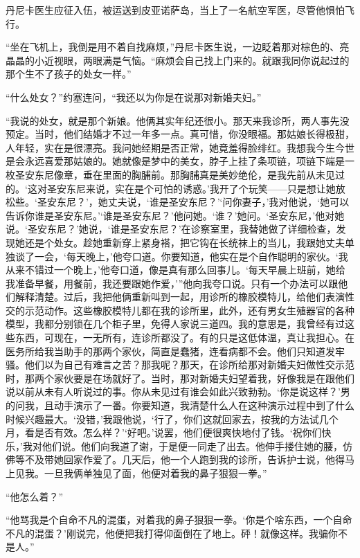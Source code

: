     丹尼卡医生应征入伍，被运送到皮亚诺萨岛，当上了一名航空军医，尽管他惧怕飞行。

    “坐在飞机上，我倒是用不着自找麻烦，”丹尼卡医生说，一边眨着那对棕色的、亮晶晶的小近视眼，两眼满是气恼。“麻烦会自己找上门来的。就跟我同你说起过的那个生不了孩子的处女一样。”

    “什么处女？”约塞连问，“我还以为你是在说那对新婚夫妇。”

    “我说的处女，就是那个新娘。他俩其实年纪还很小。那天来我诊所，两人事先没预定。当时，他们结婚才不过一年多一点。真可惜，你没眼福。那姑娘长得极甜，人年轻，实在是很漂亮。我问她经期是否正常，她竟羞得脸绯红。我想我今生今世是会永远喜爱那姑娘的。她就像是梦中的美女，脖子上挂了条项链，项链下端是一枚圣安东尼像章，垂在里面的胸脯前。那胸脯真是美妙绝伦，是我先前从未见过的。‘这对圣安东尼来说，实在是个可怕的诱惑。’我开了个玩笑——只是想让她放松些。‘圣安东尼？’，她丈夫说，‘谁是圣安东尼？’‘问你妻子，’我对他说，‘她可以告诉你谁是圣安东尼。’‘谁是圣安东尼？’他问她。‘谁？’她问。‘圣安东尼，’他对她说。‘圣安东尼？’她说，‘谁是圣安东尼？’在诊察室里，我替她做了详细检查，发现她还是个处女。趁她重新穿上紧身褡，把它钩在长统袜上的当儿，我跟她丈夫单独谈了一会，‘每天晚上，’他夸口道。你要知道，他实在是个自作聪明的家伙。‘我从来不错过一个晚上，’他夸口道，像是真有那么回事儿。‘每天早晨上班前，她给我准备早餐，用餐前，我还要跟她作爱，’”他向我夸口说。只有一个办法可以跟他们解释清楚。过后，我把他俩重新叫到一起，用诊所的橡胶模特儿，给他们表演性交的示范动作。这些橡胶模特儿都在我的诊所里，此外，还有男女生殖器官的各种模型，我都分别锁在几个柜子里，免得人家说三道四。我的意思是，我曾经有过这些东西，可现在，一无所有，连诊所都没了。有的只是这低体温，真让我担心。在医务所给我当助手的那两个家伙，简直是蠢猪，连看病都不会。他们只知道发牢骚。他们以为自己有难言之苦？那我呢？那天，在诊所给那对新婚夫妇做性交示范时，那两个家伙要是在场就好了。当时，那对新婚夫妇望着我，好像我是在跟他们说以前从未有人听说过的事。你从未见过有谁会如此兴致勃勃。‘你是说这样？’男的问我，且动手演示了一番。你要知道，我清楚什么人在这种演示过程中到了什么时候兴趣最大。‘没错，’我跟他说，‘行了，你们这就回家去，按我的方法试几个月，看是否有效。怎么样？’‘好吧。’说罢，他们便很爽快地付了钱。‘祝你们快乐，’我对他们说。他们向我道了谢，于是便一同走了出去。他伸手搂住她的腰，仿佛等不及带她回家作爱了。几天后，他一个人跑到我的诊所，告诉护士说，他得马上见我。一旦我俩单独见了面，他便对着我的鼻子狠狠一拳。”

    “他怎么着？”

    “他骂我是个自命不凡的混蛋，对着我的鼻子狠狠一拳。‘你是个啥东西，一个自命不凡的混蛋？’刚说完，他便把我打得仰面倒在了地上。砰！就像这样。我骗你不是人。”

